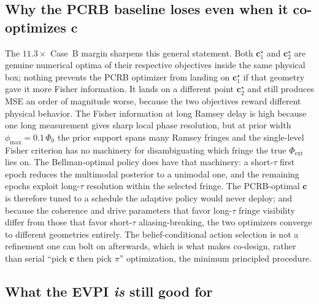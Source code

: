 \documentclass[11pt,a4paper,onecolumn]{article}
\newcommand{\bc}{\bm{c}}
\begin{document}
\subsection{Why the PCRB baseline loses even when it co-optimizes \texorpdfstring{$\bc$}{c}}

The $11.3\times$ Case~B margin sharpens this general statement.  Both $\bc^\star_1$ and $\bc^\star_2$ are genuine numerical optima of their respective objectives inside the same physical box; nothing prevents the PCRB optimizer from landing on $\bc^\star_1$ if that geometry gave it more Fisher information.  It lands on a different point $\bc^\star_2$ and still produces MSE an order of magnitude worse, because the two objectives reward different physical behavior.  The Fisher information at long Ramsey delay is high because one long measurement gives sharp local phase resolution, but at prior width $\phi_{\max} = 0.1\,\Phi_0$ the prior support spans many Ramsey fringes and the single-level Fisher criterion has no machinery for disambiguating which fringe the true $\Phi_\mathrm{ext}$ lies on.  The Bellman-optimal policy does have that machinery: a short-$\tau$ first epoch reduces the multimodal posterior to a unimodal one, and the remaining epochs exploit long-$\tau$ resolution within the selected fringe.  The PCRB-optimal $\bc$ is therefore tuned to a schedule the adaptive policy would never deploy; and because the coherence and drive parameters that favor long-$\tau$ fringe visibility differ from those that favor short-$\tau$ aliasing-breaking, the two optimizers converge to different geometries entirely.  The belief-conditional action selection is not a refinement one can bolt on afterwards, which is what makes co-design, rather than serial ``pick $\bc$ then pick $\pi$'' optimization, the minimum principled procedure.

\subsection{What the EVPI \emph{is} still good for}
\end{document}
